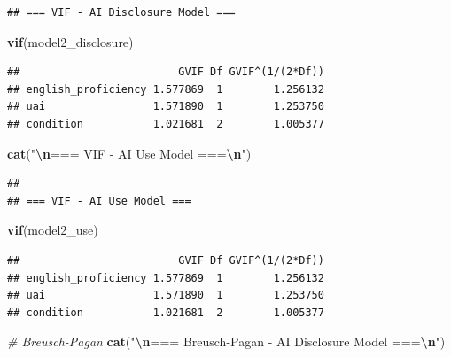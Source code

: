 \documentclass[
]{article}
\newenvironment{Shaded}{\begin{snugshade}}{\end{snugshade}}
\newcommand{\CommentTok}[1]{\textcolor[rgb]{0.56,0.35,0.01}{\textit{#1}}}
\newcommand{\FunctionTok}[1]{\textcolor[rgb]{0.13,0.29,0.53}{\textbf{#1}}}
\newcommand{\NormalTok}[1]{#1}
\newcommand{\SpecialCharTok}[1]{\textcolor[rgb]{0.81,0.36,0.00}{\textbf{#1}}}
\newcommand{\StringTok}[1]{\textcolor[rgb]{0.31,0.60,0.02}{#1}}
\begin{document}
\begin{verbatim}
## === VIF - AI Disclosure Model ===
\end{verbatim}

\begin{Shaded}
\begin{Highlighting}[]
\FunctionTok{vif}\NormalTok{(model2\_disclosure)}
\end{Highlighting}
\end{Shaded}

\begin{verbatim}
##                         GVIF Df GVIF^(1/(2*Df))
## english_proficiency 1.577869  1        1.256132
## uai                 1.571890  1        1.253750
## condition           1.021681  2        1.005377
\end{verbatim}

\begin{Shaded}
\begin{Highlighting}[]
\FunctionTok{cat}\NormalTok{(}\StringTok{"}\SpecialCharTok{\textbackslash{}n}\StringTok{=== VIF {-} AI Use Model ===}\SpecialCharTok{\textbackslash{}n}\StringTok{"}\NormalTok{)}
\end{Highlighting}
\end{Shaded}

\begin{verbatim}
## 
## === VIF - AI Use Model ===
\end{verbatim}

\begin{Shaded}
\begin{Highlighting}[]
\FunctionTok{vif}\NormalTok{(model2\_use)}
\end{Highlighting}
\end{Shaded}

\begin{verbatim}
##                         GVIF Df GVIF^(1/(2*Df))
## english_proficiency 1.577869  1        1.256132
## uai                 1.571890  1        1.253750
## condition           1.021681  2        1.005377
\end{verbatim}

\begin{Shaded}
\begin{Highlighting}[]
\CommentTok{\# Breusch{-}Pagan}
\FunctionTok{cat}\NormalTok{(}\StringTok{"}\SpecialCharTok{\textbackslash{}n}\StringTok{=== Breusch{-}Pagan {-} AI Disclosure Model ===}\SpecialCharTok{\textbackslash{}n}\StringTok{"}\NormalTok{)}
\end{Highlighting}
\end{Shaded}
\end{document}
